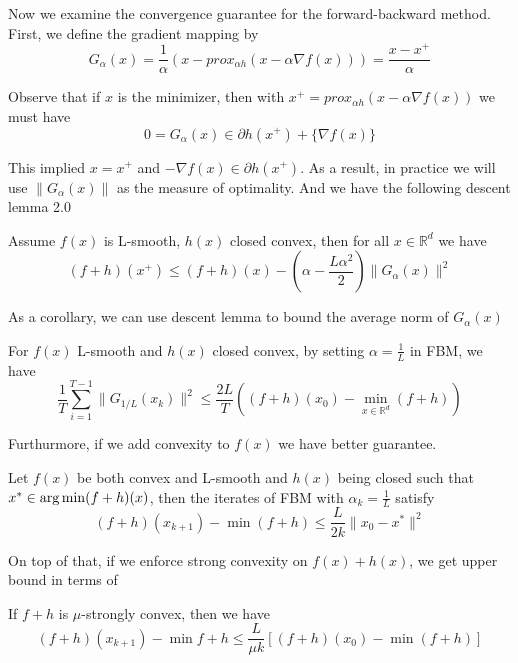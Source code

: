 Now we examine the convergence guarantee for the forward-backward method. First, we define the gradient mapping by
\begin{equation*}
    G_\alpha(x) = \frac{1}{\alpha}(x - prox_{\alpha h}(x - \alpha \nabla f(x))) = \frac{x - x^+}{\alpha}
\end{equation*}

Observe that if $x$ is the minimizer, then with $x^+ = prox_{\alpha h}(x - \alpha \nabla f(x))$ we must have 
\begin{equation*}
    0 = G_\alpha(x) \in \partial h(x^+) + \{ \nabla f(x) \}
\end{equation*}

This implied $x = x^+$ and $-\nabla f(x) \in \partial h(x^+)$. As a result, in practice we will use $\| G_\alpha(x) \|$ as the measure of optimality. And we have the following descent lemma 2.0
\begin{lemma}
    Assume $f(x)$ is L-smooth, $h(x)$ closed convex, then for all $x \in \mathbb{R}^d$ we have
    \begin{equation*}
        (f + h)(x^+) \leq (f + h)(x) - (\alpha - \frac{L\alpha^2}{2})\|G_\alpha(x)\|^2
    \end{equation*}
\end{lemma}

As a corollary, we can use descent lemma to bound the average norm of $G_\alpha(x)$
\begin{corollary}
    For $f(x)$ L-smooth and $h(x)$ closed convex, by setting $\alpha = \frac{1}{L}$ in FBM, we have
    \begin{equation*}
        \frac{1}{T}\sum_{i=1}^{T-1}\| G_{1/L}(x_k)\|^2 \leq \frac{2L}{T}((f+h)(x_0) - \min_{x \in \mathbb{R}^d} (f+h))
    \end{equation*}
\end{corollary}

Furthurmore, if we add convexity to $f(x)$ we have better guarantee.
\begin{theorem}
    Let $f(x)$ be both convex and L-smooth and $h(x)$ being closed such that $x^* \in \operatorname*{arg\,min} (f + h)(x)$, then the iterates of FBM with $\alpha_k = \frac{1}{L}$ satisfy
    \begin{equation*}
        (f + h)(x_{k+1}) - \min (f + h) \leq \frac{L}{2k}\|x_0 - x^*\|^2
    \end{equation*}
\end{theorem}

On top of that, if we enforce strong convexity on $f(x) + h(x)$, we get upper bound in terms of 
\begin{theorem}
    If $f+h$ is $\mu$-strongly convex, then we have 
    \begin{equation*}
        (f+h)(x_{k+1}) - \min f+h \leq \frac{L}{\mu k} [(f+h)(x_0) - \min (f+h)]
    \end{equation*}
\end{theorem}

